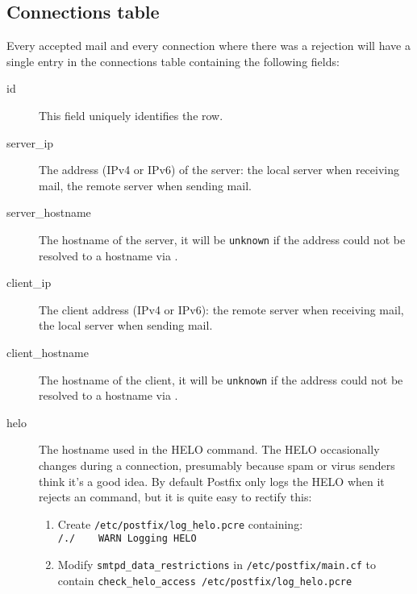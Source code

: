 \documentclass[a4paper,12pt,draft]{article}
\newcommand{\tab}[0]{%
    \hspace*{2em}%
}
\begin{document}
\subsection{Connections table}

\label{connections table}

Every accepted mail and every connection where there was a rejection will
have a single entry in the connections table containing the following
fields:

\begin{description}

    \item [id] This field uniquely identifies the row.

    \item [server\_ip] The \IP{} address (IPv4 or IPv6) of the server: the
        local server when receiving mail, the remote server when sending
        mail.

    \item [server\_hostname] The hostname of the server, it will be
        \texttt{unknown} if the \IP{} address could not be resolved to a
        hostname via \DNS{}\@.

    \item [client\_ip] The client \IP{} address (IPv4 or IPv6): the remote
        server when receiving mail, the local server when sending mail.

    \item [client\_hostname] The hostname of the client, it will be
        \texttt{unknown} if the \IP{} address could not be resolved to a
        hostname via \DNS{}\@.

    \item [helo] The hostname used in the HELO command.  The HELO
        occasionally changes during a connection, presumably because spam
        or virus senders think it's a good idea.  By default Postfix only
        logs the HELO when it rejects an \SMTP{} command, but it is quite
        easy to rectify this:

\label{logging helo}

        \begin{enumerate}

            \item Create \texttt{/etc/postfix/log\_helo.pcre}
                containing:\newline \tab{}\texttt{/./~~~~WARN~Logging~HELO}

            \item Modify \texttt{smtpd\_data\_restrictions} in
                \texttt{/etc/postfix/main.cf} to contain\newline
                \tab{}\texttt{check\_helo\_access~/etc/postfix/log\_helo.pcre}


\end{enumerate}
\end{description}
\end{document}
